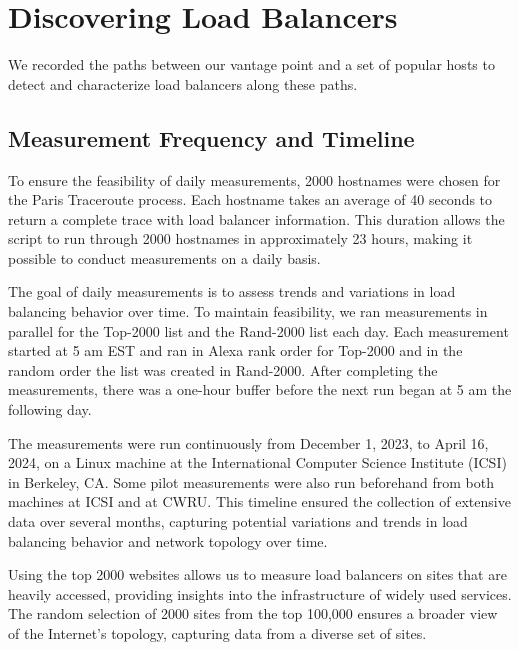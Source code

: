 \documentclass[12pt]{cwru_thesis}
\begin{document}
\section{Discovering Load Balancers}

We recorded the paths between our vantage point and a set of popular hosts to detect and characterize load balancers along these paths. 

\subsection{Measurement Frequency and Timeline}
\label{subsec:freq}


To ensure the feasibility of daily measurements, 2000 hostnames were chosen for the Paris Traceroute process. Each hostname takes an average of 40 seconds to return a complete trace with load balancer information. This duration allows the script to run through 2000 hostnames in approximately 23 hours, making it possible to conduct measurements on a daily basis.

The goal of daily measurements is to assess trends and variations in load balancing behavior over time. To maintain feasibility, we ran measurements in parallel for the Top-2000 list and the Rand-2000 list each day. Each measurement started at 5 am EST and ran in Alexa rank order for Top-2000 and in the random order the list was created in Rand-2000. After completing the measurements, there was a one-hour buffer before the next run began at 5 am the following day.

The measurements were run continuously from December 1, 2023, to April 16, 2024, on a Linux machine at the International Computer Science Institute (ICSI) in Berkeley, CA. Some pilot measurements were also run beforehand from both machines at ICSI and at CWRU.
This timeline ensured the collection of extensive data over several months, capturing potential variations and trends in load balancing behavior and network topology over time. 

Using the top 2000 websites allows us to measure load balancers on sites that are heavily accessed, providing insights into the infrastructure of widely used services. The random selection of 2000 sites from the top 100,000 ensures a broader view of the Internet's topology, capturing data from a diverse set of sites.
\end{document}

